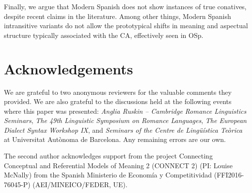 \documentclass[output=paper,colorlinks,citecolor=brown,
]{langscibook}
\begin{document}
Finally, we argue that Modern Spanish does not show instances of true conatives, despite recent claims in the literature. Among other things, Modern Spanish intransitive variants do not allow the prototypical shifts in meaning and aspectual structure typically associated with the CA, effectively seen in OSp. 


\section*{Acknowledgements}
We are grateful to two anonymous reviewers for the valuable comments they provided. We are also grateful to the discussions held at the following events where this paper was presented: \textit{Anglia Ruskin – Cambridge Romance Linguistics Seminars}, \textit{The 49th Linguistic Symposium on Romance Languages}, \textit{The European Dialect Syntax Workshop IX}, and \textit{Seminars of the Centre de Lingüística Teòrica} at Universitat Autònoma de Barcelona. Any remaining errors are our own.

The second author acknowledges support from the project Connecting Conceptual and Referential Models of Meaning 2 (CONNECT 2) (PI: Louise McNally) from the Spanish Ministerio de Economía y Competitividad (FFI2016-76045-P) (AEI/MINEICO/FEDER, UE).

\printbibliography[heading=subbibliography,notkeyword=this]
\end{document}
